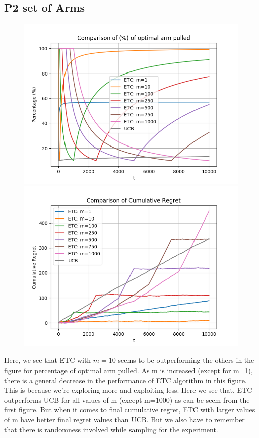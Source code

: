 \documentclass[12pt]{report}
\begin{document}
		\subsection{P2 set of Arms}
			\begin{figure}[H]
				\includegraphics[scale=0.85]{Figures/Combined_op_P2.png}
				\includegraphics[scale=0.85]{Figures/Combined_regret_P2.png}
			\end{figure}
			
		\noindent Here, we see that ETC with $m = 10$ seems to be outperforming the others in the figure for percentage of optimal arm pulled. As m is increased (except for m=1), there is a general decrease in the performance of ETC algorithm in this figure. This is because we're exploring more and exploiting less. Here we see that, ETC outperforms UCB for all values of m (except m=1000) as can be seem from the first figure. But when it comes to final cumulative regret, ETC with larger values of m have better final regret values than UCB. But we also have to remember that there is randomness involved while sampling for the experiment.\\\\
		
\end{document}
